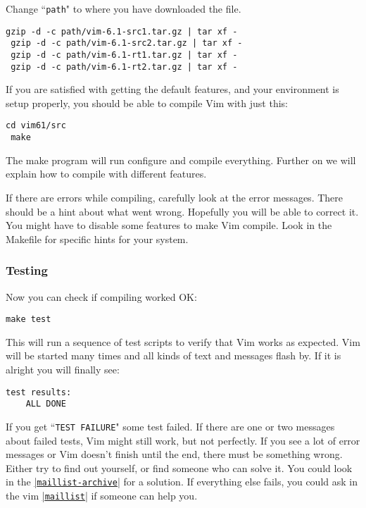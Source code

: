 Change ``\texttt{path}" to where you have downloaded the file.

\begin{Verbatim}[samepage=true]
 gzip -d -c path/vim-6.1-src1.tar.gz | tar xf -
 gzip -d -c path/vim-6.1-src2.tar.gz | tar xf -
 gzip -d -c path/vim-6.1-rt1.tar.gz | tar xf -
 gzip -d -c path/vim-6.1-rt2.tar.gz | tar xf -
\end{Verbatim}

If you are satisfied with getting the default features, and your environment is setup properly, you should be able to compile Vim with just this:

\begin{Verbatim}[samepage=true]
 cd vim61/src
 make
\end{Verbatim}

The make program will run configure and compile everything.
Further on we will explain how to compile with different features.

If there are errors while compiling, carefully look at the error messages.
There should be a hint about what went wrong.
Hopefully you will be able to correct it.
You might have to disable some features to make Vim compile.
Look in the Makefile for specific hints for your system.

\subsubsection{Testing}
Now you can check if compiling worked OK:

\begin{Verbatim}[samepage=true]
 make test
\end{Verbatim}

This will run a sequence of test scripts to verify that Vim works as expected.
Vim will be started many times and all kinds of text and messages flash by.
If it is alright you will finally see:

\begin{Verbatim}[samepage=true]
    test results: 
    ALL DONE 
\end{Verbatim}

If you get ``\texttt{TEST FAILURE}" some test failed.
If there are one or two messages about failed tests, Vim might still work, but not perfectly.
If you see a lot of error messages or Vim doesn't finish until the end, there must be something wrong.
Either try to find out yourself, or find someone who can solve it.
You could look in the \hyperref[maillist-archive]{|\texttt{maillist-archive}|} for a solution.
If everything else fails, you could ask in the vim \hyperref[maillist]{|\texttt{maillist}|} if someone can help you.

